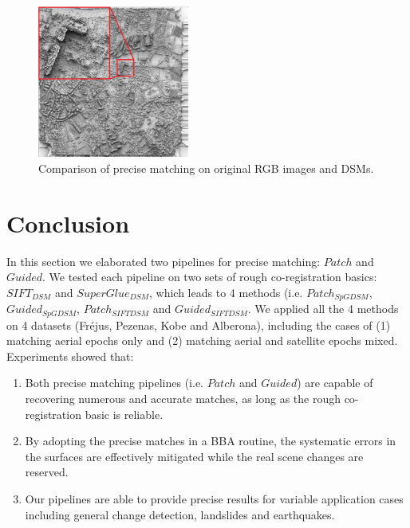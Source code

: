\begin{figure}[htbp]
\begin{center}
{\begin{minipage}[t]{0.38\linewidth}
				\centering
				\includegraphics[width=5cm]{images/appendix4/DepthShade.png}
			\end{minipage}%
		}
		\caption{Comparison of precise matching on original RGB images and DSMs.}
		\label{precisematchingdepth}
	\end{center}
\end{figure} 


\section{Conclusion}
In this section we elaborated two pipelines for precise matching: $Patch$ and $Guided$. 
We tested each pipeline on two sets of rough co-registration basics: $SIFT_{DSM}$ and $SuperGlue_{DSM}$, which leads to 4 methods (i.e.  $Patch_{SpGDSM}$,  $Guided_{SpGDSM}$,  $Patch_{SIFTDSM}$ and  $Guided_{SIFTDSM}$.
We applied all the 4 methods on 4 datasets (Fr{\'e}jus, Pezenas, Kobe and Alberona), including the cases of (1) matching aerial epochs only and (2) matching aerial and satellite epochs mixed.
Experiments showed that:\\
\begin{enumerate}
	\item Both precise matching pipelines (i.e. $Patch$ and $Guided$) are capable of recovering numerous and accurate matches, as long as the rough co-registration basic is reliable.\\
	\item By adopting the precise matches in a \ac{BBA} routine, the systematic errors in the surfaces are effectively mitigated while the real scene changes are reserved.
	\item Our pipelines are able to provide precise results for variable application cases including general change detection, landslides and earthquakes.
\end{enumerate}



